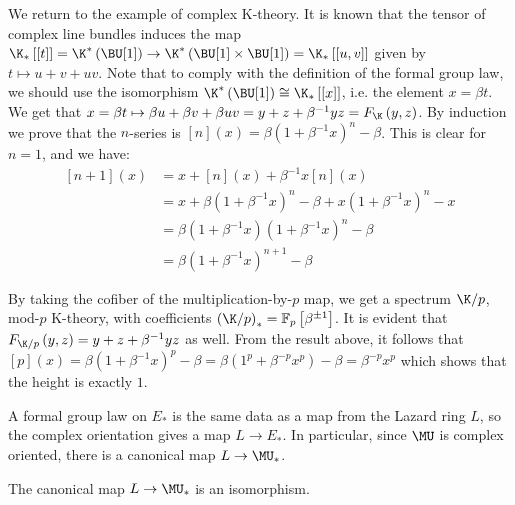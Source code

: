 \begin{example}
	We return to the example of complex K-theory.
	It is known that the tensor of complex line bundles induces the map
	$
	\K_*\left[\left[t\right]\right]
	= \K^*\left(\BU[1]\right)
	\to \K^*\left(\BU[1] \times \BU[1]\right)
	= \K_*\left[\left[u,v\right]\right]
	$
	given by $t \mapsto u + v + u v$.
	Note that to comply with the definition of the formal group law, we should use the isomorphism
	$\K^*\left(\BU[1]\right) \cong \K_* \left[\left[x\right]\right]$,
	i.e. the element $x = \beta t$.
	We get that $x = \beta t \mapsto \beta u + \beta v + \beta u v = y + z + \beta^{-1} y z = F_{\K}\left(y,z\right)$.
	By induction we prove that the $n$-series is $\left[n\right]\left(x\right) = \beta \left(1 + \beta^{-1} x\right)^n - \beta$.
	This is clear for $n = 1$, and we have:
	\begin{align*} 
		\left[n+1\right]\left(x\right)
		&= x + \left[n\right]\left(x\right) + \beta^{-1} x \left[n\right]\left(x\right)\\
		&= x + \beta \left(1 + \beta^{-1} x\right)^n - \beta + x \left(1 + \beta^{-1} x\right)^n - x\\
		&= \beta \left(1 + \beta^{-1} x\right) \left(1 + \beta^{-1} x\right)^n - \beta\\
		&= \beta \left(1 + \beta^{-1} x\right)^{n+1} - \beta
	\end{align*}
\end{example}


\begin{example}
	By taking the cofiber of the multiplication-by-$p$ map, we get a spectrum $\K/p$, mod-$p$ K-theory, with coefficients $\left(\K/p\right)_* = \mathbb{F}_p \left[\beta^{\pm 1}\right]$.
	It is evident that $F_{\K/p}\left(y,z\right) = y + z + \beta^{-1} y z$ as well.
	From the result above, it follows that
	$
	\left[p\right]\left(x\right)
	= \beta \left(1 + \beta^{-1} x\right)^p - \beta
	= \beta \left(1^p + \beta^{-p} x^p\right) - \beta
	= \beta^{-p} x^p
	$
	which shows that the height is exactly $1$.
\end{example}

A formal group law on $E_*$ is the same data as a map from the Lazard ring $L$, so the complex orientation gives a map $L \to E_*$.
In particular, since $\MU$ is complex oriented, there is a canonical map $L \to \MU_*$.

\begin{theorem}\label{quillen-theorem}
	The canonical map $L \to \MU_*$ is an isomorphism.
\end{theorem}



